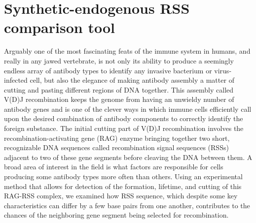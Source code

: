 \documentclass[11pt, oneside]{article}   	%
\begin{document}
\section*{Synthetic-endogenous RSS comparison tool}
\author{Griffin Chure, Soichi Hirokawa}

Arguably one of the most fascinating feats of the immune system in humans, and really in any jawed vertebrate, is not only
its ability to produce a seemingly endless array of antibody types to identify any invasive bacterium or virus-infected cell,
but also the elegance of making antibody assembly a matter of cutting and pasting different regions of DNA together. This
assembly called V(D)J recombination keeps the genome from having an unwieldy number of antibody genes and is one of
the clever ways in which immune cells efficiently call upon the desired combination of antibody components to correctly
identify the foreign substance. The initial cutting part of V(D)J recombination involves the recombination-activating gene (RAG)
enzyme bringing together two short, recognizable DNA sequences called recombination signal sequences (RSSs) adjacent 
to two of these gene segments before cleaving the DNA between them. A broad area of interest in the field is what factors
are responsible for cells producing some antibody types more often than others. Using an experimental method that allows for
detection of the formation, lifetime, and cutting of this RAG-RSS complex, we examined how RSS sequence, which despite
some key characteristics can differ by a few base pairs from one another, contributes to the chances of the neighboring gene
segment being selected for recombination.
\end{document}
